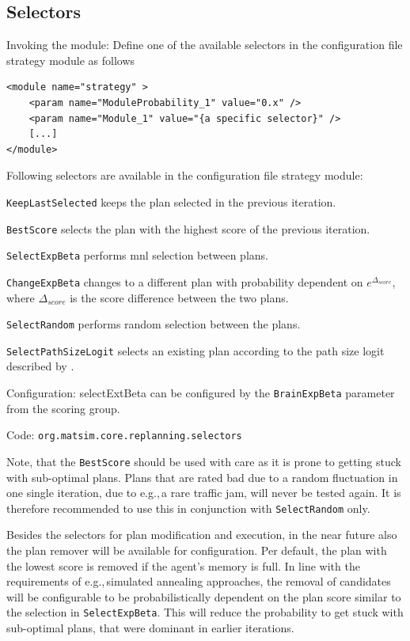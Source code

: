 \subsection{Selectors}
\label{sec:selectors}
\begin{compactitem}
\item Invoking the module: Define one of the available selectors in the configuration file strategy module as follows
%
\begin{lstlisting}
<module name="strategy" >
    <param name="ModuleProbability_1" value="0.x" />
    <param name="Module_1" value="{a specific selector}" />
    [...]
</module>
\end{lstlisting}
%
Following selectors are available in the configuration file strategy module:
%
\begin{compactitem}
	\item \lstinline|KeepLastSelected| keeps the plan selected in the previous iteration.
	\item \lstinline|BestScore| selects the plan with the highest score of the previous iteration.
	\item \lstinline|SelectExpBeta| performs \gls{mnl} selection between plans.
	\item \lstinline|ChangeExpBeta| changes to a different plan with probability dependent on $e^{\Delta_{score}}$, where $\Delta_{score}$ is the score difference between the two plans.
	\item \lstinline|SelectRandom| performs random selection between the plans.
	\item \lstinline|SelectPathSizeLogit| selects an existing plan according to the path size logit described by \citet[][]{FrejingerBierlaire_TransResB_2007}.
\end{compactitem}
%
\item Configuration: selectExtBeta can be configured by the \lstinline|BrainExpBeta| parameter from the scoring group.
\item Code: \lstinline|org.matsim.core.replanning.selectors|
\end{compactitem}

Note, that the \lstinline|BestScore| should be used with care as it is prone to getting stuck with sub-optimal plans. Plans that are rated bad due to a random fluctuation in one single iteration, due to e.g.,\,a rare traffic jam, will never be tested again. It is therefore recommended to use this in conjunction with \lstinline|SelectRandom| only.

Besides the selectors for plan modification and execution, in the near future also the plan remover will be available for configuration. Per default, the plan with the lowest score is removed if the agent's memory is full. In line with the requirements of e.g.,\,simulated annealing approaches, the removal of candidates will be configurable to be probabilistically dependent on the plan score similar to the selection in \lstinline|SelectExpBeta|. This will reduce the probability to get stuck with sub-optimal plans, that were dominant in earlier iterations.

